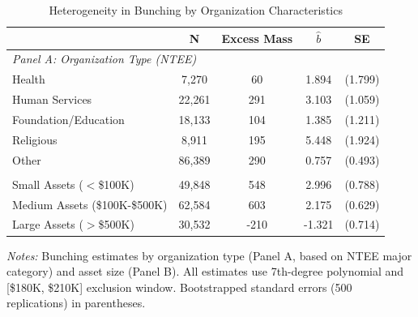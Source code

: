 \begin{table}[htbp]
\centering
\caption{Heterogeneity in Bunching by Organization Characteristics}
\label{tab:heterogeneity}
\begin{tabular}{lcccc}
\hline\hline
 & N & Excess Mass & $\hat{b}$ & SE \\
\hline
\multicolumn{5}{l}{\textit{Panel A: Organization Type (NTEE)}} \\
Health & 7,270 & 60 & 1.894 & (1.799) \\
Human Services & 22,261 & 291 & 3.103 & (1.059) \\
Foundation/Education & 18,133 & 104 & 1.385 & (1.211) \\
Religious & 8,911 & 195 & 5.448 & (1.924) \\
Other & 86,389 & 290 & 0.757 & (0.493) \\
\addlinespace
\multicolumn{5}{l}{\textit{Panel B: Asset Size}} \\
Small Assets ($<$\$100K) & 49,848 & 548 & 2.996 & (0.788) \\
Medium Assets (\$100K-\$500K) & 62,584 & 603 & 2.175 & (0.629) \\
Large Assets ($>$\$500K) & 30,532 & -210 & -1.321 & (0.714) \\
\hline\hline
\end{tabular}
\begin{tablenotes}
\item \textit{Notes:} Bunching estimates by organization type (Panel A, based on NTEE major category) and asset size (Panel B). All estimates use 7th-degree polynomial and [\$180K, \$210K] exclusion window. Bootstrapped standard errors (500 replications) in parentheses.
\end{tablenotes}
\end{table}
